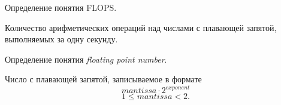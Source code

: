 \begin{questions}
\question[3] Определение понятия FLOPS.
\begin{solution}[1cm]
Количество арифметических операций над числами с плавающей запятой, выполняемых за одну секунду.
\end{solution}

\question[3] Определение понятия \textit{floating point number}.
\begin{solution}[1cm]
Число с плавающей запятой, записываемое в формате $$mantissa \cdot 2^{exponent}$$ $$1 \le mantissa < 2.$$
\end{solution}


\end{questions}


% 
% 
% 
% 
% 
% 
% 
%         
% 


 
 